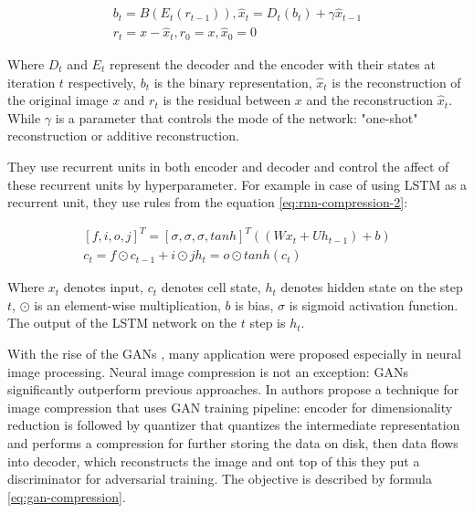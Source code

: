 \begin{equation}
    \label{eq:rnn-compression-1}
    \begin{split}
        b_t = B(E_t(r_{t-1})), \hat{x}_t = D_t(b_t) + \gamma \hat{x}_{t-1} \\
        r_t = x - \hat{x}_t, r_0 = x, \hat{x}_0 = 0
    \end{split}
\end{equation}

Where $D_t$ and $E_t$ represent the decoder and the encoder with their states at iteration $t$ respectively, $b_t$ is the binary representation, $\hat{x}_t$ is the reconstruction of the original image $x$ and $r_t$ is the residual between $x$ and the reconstruction $\hat{x}_t$. While $\gamma$ is a parameter that controls the mode of the network: "one-shot" reconstruction or additive reconstruction.

They use recurrent units in both encoder and decoder and control the affect of these recurrent units by hyperparameter. For example in case of using LSTM as a recurrent unit, they use rules from the equation \ref{eq:rnn-compression-2}:

\begin{equation}
    \label{eq:rnn-compression-2}
    \begin{split}
        [f, i, o, j]^T = [\sigma, \sigma, \sigma, tanh]^T((W x_t + U h_{t-1}) + b) \\
        c_t = f \odot c_{t-1} + i \odot j
        h_t = o \odot tanh(c_t)
    \end{split}
\end{equation}

Where $x_t$ denotes input, $c_t$ denotes cell state, $h_t$ denotes hidden state on the step $t$, $\odot$ is an element-wise multiplication, $b$ is bias, $\sigma$ is sigmoid activation function. The output of the LSTM network on the $t$ step is $h_t$.

With the rise of the GANs \cite{Goodfellow_Pouget-Abadie_Mirza_Xu_Warde-Farley_Ozair_Courville_Bengio_2014}, many application were proposed especially in neural image processing. Neural image compression is not an exception: GANs significantly outperform previous approaches. In \cite{agustsson_generative_2019} authors propose a technique for image compression that uses GAN training pipeline: encoder for dimensionality reduction is followed by quantizer that quantizes the intermediate representation and performs a compression for further storing the data on disk, then data flows into decoder, which reconstructs the image and ont top of this they put a discriminator for adversarial training. The objective is described by formula \ref{eq:gan-compression}.

